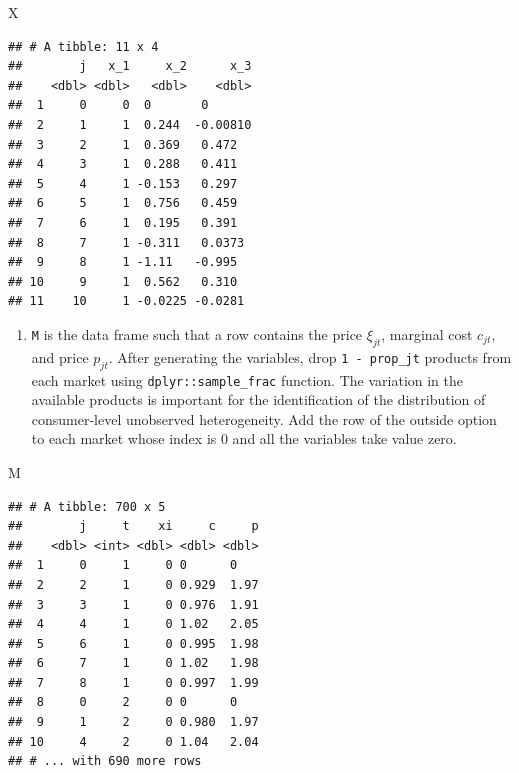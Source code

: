 \documentclass[
]{book}
\newenvironment{Shaded}{\begin{snugshade}}{\end{snugshade}}
\newcommand{\NormalTok}[1]{#1}
\providecommand{\tightlist}{%
  \setlength{\itemsep}{0pt}\setlength{\parskip}{0pt}}
\begin{document}
\begin{Shaded}
\begin{Highlighting}[]
\NormalTok{X}
\end{Highlighting}
\end{Shaded}

\begin{verbatim}
## # A tibble: 11 x 4
##        j   x_1     x_2      x_3
##    <dbl> <dbl>   <dbl>    <dbl>
##  1     0     0  0       0      
##  2     1     1  0.244  -0.00810
##  3     2     1  0.369   0.472  
##  4     3     1  0.288   0.411  
##  5     4     1 -0.153   0.297  
##  6     5     1  0.756   0.459  
##  7     6     1  0.195   0.391  
##  8     7     1 -0.311   0.0373 
##  9     8     1 -1.11   -0.995  
## 10     9     1  0.562   0.310  
## 11    10     1 -0.0225 -0.0281
\end{verbatim}

\begin{enumerate}
\def\labelenumi{\arabic{enumi}.}
\setcounter{enumi}{2}
\tightlist
\item
  \texttt{M} is the data frame such that a row contains the price \(\xi_{jt}\), marginal cost \(c_{jt}\), and price \(p_{jt}\). After generating the variables, drop \texttt{1\ -\ prop\_jt} products from each market using \texttt{dplyr::sample\_frac} function. The variation in the available products is important for the identification of the distribution of consumer-level unobserved heterogeneity. Add the row of the outside option to each market whose index is \(0\) and all the variables take value zero.
\end{enumerate}

\begin{Shaded}
\begin{Highlighting}[]
\NormalTok{M}
\end{Highlighting}
\end{Shaded}

\begin{verbatim}
## # A tibble: 700 x 5
##        j     t    xi     c     p
##    <dbl> <int> <dbl> <dbl> <dbl>
##  1     0     1     0 0      0   
##  2     2     1     0 0.929  1.97
##  3     3     1     0 0.976  1.91
##  4     4     1     0 1.02   2.05
##  5     6     1     0 0.995  1.98
##  6     7     1     0 1.02   1.98
##  7     8     1     0 0.997  1.99
##  8     0     2     0 0      0   
##  9     1     2     0 0.980  1.97
## 10     4     2     0 1.04   2.04
## # ... with 690 more rows
\end{verbatim}
\end{document}
